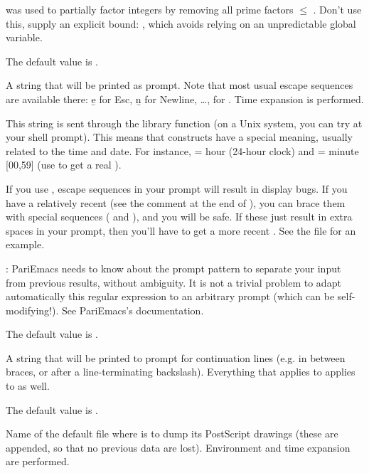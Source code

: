 {  was used to partially
factor integers by removing all prime factors $\leq$ .
Don't use this, supply an explicit bound: ,
which avoids relying on an unpredictable global variable.

The default value is .

\label{se:def,prompt}
A string that will be printed as
prompt. Note that most usual escape sequences are available there: \b{e} for
Esc, \b{n} for Newline, \dots, \kbd{\bs\bs} for \kbd{\bs}. Time expansion is
performed.

This string is sent through the library function  (on a
Unix system, you can try  at your shell prompt). This means
that \kbd{\%} constructs have a special meaning, usually related to the time
and date. For instance,  = hour (24-hour clock) and  =
minute [00,59] (use \kbd{\%\%} to get a real \kbd{\%}).

If you use , escape sequences in your prompt will result in
display bugs. If you have a relatively recent  (see the comment
at the end of ), you can brace them with special sequences
(\kbd{\bs[} and \kbd{\bs]}), and you will be safe. If these just result in
extra spaces in your prompt, then you'll have to get a more recent
. See the file  for an example.

: PariEmacs needs to know about the prompt pattern to
separate your input from previous  results, without ambiguity. It is
not a trivial problem to adapt automatically this regular expression to an
arbitrary prompt (which can be self-modifying!). See PariEmacs's
documentation.

The default value is .

\label{se:def,prompt_cont}
A string that will be printed
to prompt for continuation lines (e.g. in between braces, or after a
line-terminating backslash). Everything that applies to 
applies to  as well.

The default value is .

\label{se:def,psfile}
Name of the default file where
 is to dump its PostScript drawings (these are appended, so that no
previous data are lost). Environment and time expansion are performed.

}
